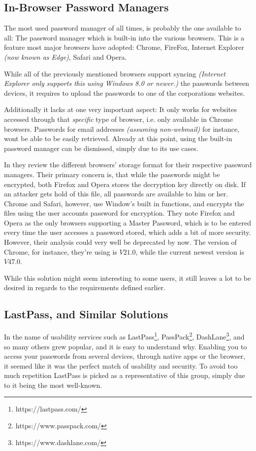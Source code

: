 		\subsection*{In-Browser Password Managers}
			\label{subsec:in-browser}

			The most used password manager of all times, is probably the one available to all: The password manager which is built-in into the various browsers. This is a feature most major browsers have adopted: Chrome, FireFox, Internet Explorer \emph{(now known as Edge)}, Safari and Opera.

			While all of the previously mentioned browsers support syncing \emph{(Internet Explorer only supports this using Windows 8.0 or newer.)} the passwords between devices, it requires to upload the passwords to one of the corporations websites.

			Additionally it lacks at one very important aspect: It only works for websites accessed through that \emph{specific} type of browser, i.e. only available in Chrome browsers. Passwords for email addresses  \emph{(assuming non-webmail)} for instance, wont be able to be easily retrieved. Already at this point, using the built-in password manager can be dismissed, simply due to its use cases.

			In \cite{browser_saved} they review the different browsers' storage format for their respective password managers. Their primary concern is, that while the passwords might be encrypted, both Firefox and Opera stores the decryption key directly on disk. If an attacker gets hold of this file, all passwords are available to him or her. Chrome and Safari, however, use Window's built in functions, and encrypts the files using the user accounts password for encryption. They note Firefox and Opera as the only browsers supporting a Master Password, which is to be entered every time the user accesses a password stored, which adds a bit of more security. However, their analysis could very well be deprecated by now. The version of Chrome, for instance, they're using is $V21.0$, while the current newest version is $V47.0$. 

			While this solution might seem interesting to some users, it still leaves a lot to be desired in regards to the requirements defined earlier.


		\subsection*{LastPass, and Similar Solutions}
			\label{subsec:lastpass}
			In the name of usability services such as LastPass\footnote{https://lastpass.com/}, PassPack\footnote{https://www.passpack.com/}, DashLane\footnote{https://www.dashlane.com/}, and so many others grew popular, and it is easy to understand why. Enabling you to access your passwords from several devices, through native apps or the browser, it seemed like it was the perfect match of usability and security. To avoid too much repetition LastPass is picked as a representative of this group, simply due to it being the most well-known.


